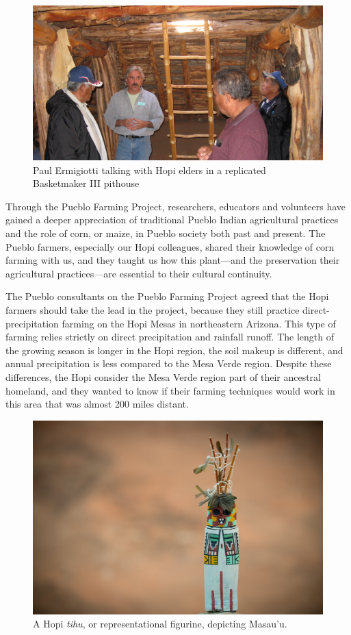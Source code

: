 \documentclass[12pt,]{article}
\begin{document}
\begin{figure}
\centering
\includegraphics{./images/chapter_6_kiva.jpg}
\caption{Paul Ermigiotti talking with Hopi elders in a replicated Basketmaker III pithouse}
\end{figure}

Through the Pueblo Farming Project, researchers, educators and volunteers have gained a deeper appreciation of traditional Pueblo Indian agricultural practices and the role of corn, or maize, in Pueblo society both past and present. The Pueblo farmers, especially our Hopi colleagues, shared their knowledge of corn farming with us, and they taught us how this plant---and the preservation their agricultural practices---are essential to their cultural continuity.

The Pueblo consultants on the Pueblo Farming Project agreed that the Hopi farmers should take the lead in the project, because they still practice direct-precipitation farming on the Hopi Mesas in northeastern Arizona. This type of farming relies strictly on direct precipitation and rainfall runoff. The length of the growing season is longer in the Hopi region, the soil makeup is different, and annual precipitation is less compared to the Mesa Verde region. Despite these differences, the Hopi consider the Mesa Verde region part of their ancestral homeland, and they wanted to know if their farming techniques would work in this area that was almost 200 miles distant.

\begin{figure}
\centering
\includegraphics{./images/section_2.1_origin.jpg}
\caption{A Hopi \emph{tihu}, or representational figurine, depicting Masau'u.}
\end{figure}
\end{document}
